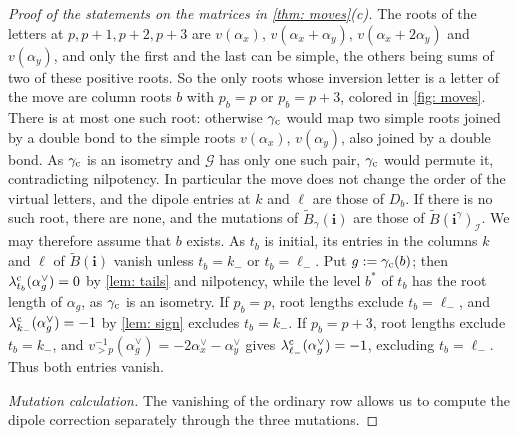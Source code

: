 \documentclass[a4paper]{amsart}
\numberwithin{equation}{section}
\theoremstyle{definition}
\theoremstyle{remark}
\newcommand{\mcG}{\mathcal{G}}
\newcommand{\mcI}{\mathcal{I}}
\newcommand{\bfi}{\mathbf{i}}
\newcommand{\tB}{\widetilde{B}}
\newcommand{\cc}{{\rm c}}
\begin{document}
\begin{proof}[Proof of the statements on the matrices in \cref{thm: moves}(c)]
  The roots of the letters at $p,p+1,p+2,p+3$ are $v(\alpha_x)$, $v(\alpha_x+\alpha_y)$, $v(\alpha_x+2\alpha_y)$ and $v(\alpha_y)$, and only the first and the last can be simple, the others being sums of two of these positive roots.
  So the only roots whose inversion letter is a letter of the move are column roots $b$ with $p_b=p$ or $p_b=p+3$, colored in \cref{fig: moves}.
  There is at most one such root: otherwise $\gamma_{\cc}$ would map two simple roots joined by a double bond to the simple roots $v(\alpha_x)$, $v(\alpha_y)$, also joined by a double bond.
  As $\gamma_{\cc}$ is an isometry and $\mcG$ has only one such pair, $\gamma_{\cc}$ would permute it, contradicting nilpotency.
  In particular the move does not change the order of the virtual letters, and the dipole entries at $k$ and $\ell$ are those of $D_b$.
  If there is no such root, there are none, and the mutations of $\tB_\gamma(\bfi)$ are those of $\tB(\bfi^\gamma)_\mcI$.
  We may therefore assume that $b$ exists.
  As $t_b$ is initial, its entries in the columns $k$ and $\ell$ of $\tB(\bfi)$ vanish unless $t_b=k_-$ or $t_b=\ell_-$.
  Put $g:=\gamma_{\cc}(b)$; then $\lambda^\cc_{t_b}(\alpha_g^\vee)=0$ by \cref{lem: tails} and nilpotency, while the level $b^*$ of $t_b$ has the root length of $\alpha_g$, as $\gamma_{\cc}$ is an isometry.
  If $p_b=p$, root lengths exclude $t_b=\ell_-$, and $\lambda^\cc_{k_-}(\alpha_g^\vee)=-1$ by \cref{lem: sign} excludes $t_b=k_-$.
  If $p_b=p+3$, root lengths exclude $t_b=k_-$, and $v_{>p}^{-1}(\alpha_g^\vee)=-2\alpha_x^\vee-\alpha_y^\vee$ gives $\lambda^\cc_{\ell_-}(\alpha_g^\vee)=-1$, excluding $t_b=\ell_-$.
  Thus both entries vanish.

  \emph{Mutation calculation.}
The vanishing of the ordinary row allows us to compute the dipole correction separately through the three mutations.


\end{proof}
\end{document}
